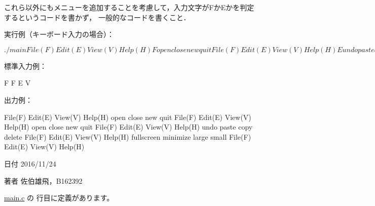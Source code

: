 これら以外にもメニューを追加することを考慮して，入力文字が\-Fか\-Eかを判定するというコードを書かず， 一般的なコードを書くこと．

実行例（キーボード入力の場合）： \begin{DoxyVerb}$ ./main
File(F) Edit(E) View(V) Help(H)
F
open close new quit
File(F) Edit(E) View(V) Help(H)
E
undo paste copy delete
File(F) Edit(E) View(V) Help(H)
V
fullscreen minimize large small
File(F) Edit(E) View(V) Help(H)
H
help search document website
File(F) Edit(E) View(V) Help(H)
D
File(F) Edit(E) View(V) Help(H)
q
$
\end{DoxyVerb}
 標準入力例： \begin{DoxyVerb}F F E V
\end{DoxyVerb}
 出力例： \begin{DoxyVerb}File(F) Edit(E) View(V) Help(H)
open close new quit
File(F) Edit(E) View(V) Help(H)
open close new quit
File(F) Edit(E) View(V) Help(H)
undo paste copy delete
File(F) Edit(E) View(V) Help(H)
fullscreen minimize large small
File(F) Edit(E) View(V) Help(H)
\end{DoxyVerb}
 \begin{DoxyDate}{日付}
2016/11/24 
\end{DoxyDate}
\begin{DoxyAuthor}{著者}
佐伯雄飛，\-B162392 
\end{DoxyAuthor}


 \hyperlink{main_8c_source}{main.\-c} の  行目に定義があります。


